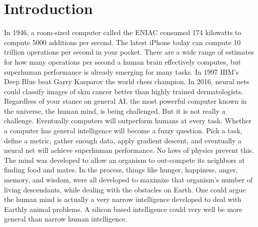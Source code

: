 \chapter{Introduction}

In 1946, a room-sized computer called the ENIAC consumed 174 kilowatts to compute 5000 additions per second.  The latest iPhone today can compute 10 trillion operations per second in your pocket.  There are a wide range of estimates for how many operations per second a human brain effectively computes, but superhuman performance is already emerging for many tasks.  In 1997 IBM's Deep Blue beat Garry Kasparov the world chess champion.  In 2016, neural nets could classify images of skin cancer better than highly trained dermatologists.  Regardless of your stance on general AI, the most powerful computer known in the universe, the human mind, is being challenged.  But it is not really a challenge.  Eventually computers will outperform humans at every task.  Whether a computer has general intelligence will become a fuzzy question.  Pick a task, define a metric, gather enough data, apply gradient descent, and eventually a neural net will achieve superhuman performance.  No laws of physics prevent this.  The mind was developed to allow an organism to out-compete its neighbors at finding food and mates.  In the process, things like hunger, happiness, anger, memory, and wisdom, were all developed to maximize that organism's number of living descendants, while dealing with the obstacles on Earth.  One could argue the human mind is actually a very narrow intelligence developed to deal with Earthly animal problems.  A silicon based intelligence could very well be more general than narrow human intelligence.

